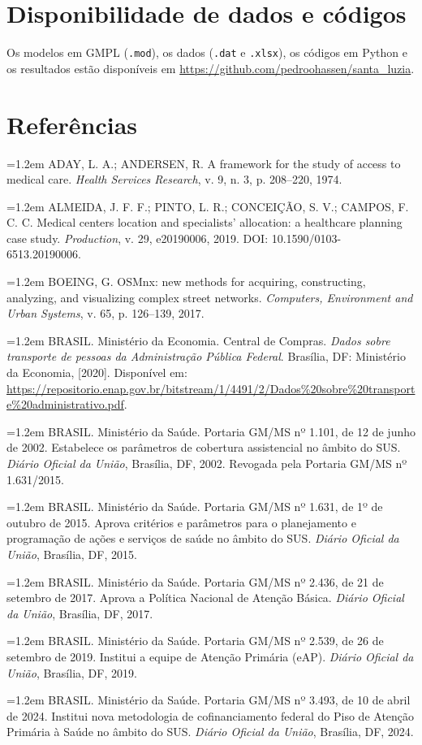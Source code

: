 \documentclass[11pt,a4paper]{article}
\newcommand{\bibentrada}[1]{\par\noindent\hangindent=1.2em\hangafter=1 #1\par\vspace{4pt}}
\begin{document}
\section*{Disponibilidade de dados e códigos}
Os modelos em GMPL (\texttt{.mod}), os dados (\texttt{.dat} e \texttt{.xlsx}), os códigos em Python e os resultados estão disponíveis em \url{https://github.com/pedroohassen/santa_luzia}.


\section*{Referências}
\bibentrada{ADAY, L. A.; ANDERSEN, R. A framework for the study of access to medical care. \textit{Health Services Research}, v. 9, n. 3, p. 208–220, 1974.}
\bibentrada{ALMEIDA, J. F. F.; PINTO, L. R.; CONCEIÇÃO, S. V.; CAMPOS, F. C. C. Medical centers location and specialists' allocation: a healthcare planning case study. \textit{Production}, v. 29, e20190006, 2019. DOI: 10.1590/0103-6513.20190006.}
\bibentrada{BOEING, G. OSMnx: new methods for acquiring, constructing, analyzing, and visualizing complex street networks. \textit{Computers, Environment and Urban Systems}, v. 65, p. 126–139, 2017.}
\bibentrada{BRASIL. Ministério da Economia. Central de Compras. \textit{Dados sobre transporte de pessoas da Administração Pública Federal}. Brasília, DF: Ministério da Economia, [2020]. Disponível em: \url{https://repositorio.enap.gov.br/bitstream/1/4491/2/Dados\%20sobre\%20transporte\%20administrativo.pdf}.}
\bibentrada{BRASIL. Ministério da Saúde. Portaria GM/MS nº 1.101, de 12 de junho de 2002. Estabelece os parâmetros de cobertura assistencial no âmbito do SUS. \textit{Diário Oficial da União}, Brasília, DF, 2002. Revogada pela Portaria GM/MS nº 1.631/2015.}
\bibentrada{BRASIL. Ministério da Saúde. Portaria GM/MS nº 1.631, de 1º de outubro de 2015. Aprova critérios e parâmetros para o planejamento e programação de ações e serviços de saúde no âmbito do SUS. \textit{Diário Oficial da União}, Brasília, DF, 2015.}
\bibentrada{BRASIL. Ministério da Saúde. Portaria GM/MS nº 2.436, de 21 de setembro de 2017. Aprova a Política Nacional de Atenção Básica. \textit{Diário Oficial da União}, Brasília, DF, 2017.}
\bibentrada{BRASIL. Ministério da Saúde. Portaria GM/MS nº 2.539, de 26 de setembro de 2019. Institui a equipe de Atenção Primária (eAP). \textit{Diário Oficial da União}, Brasília, DF, 2019.}
\bibentrada{BRASIL. Ministério da Saúde. Portaria GM/MS nº 3.493, de 10 de abril de 2024. Institui nova metodologia de cofinanciamento federal do Piso de Atenção Primária à Saúde no âmbito do SUS. \textit{Diário Oficial da União}, Brasília, DF, 2024.}
\end{document}
